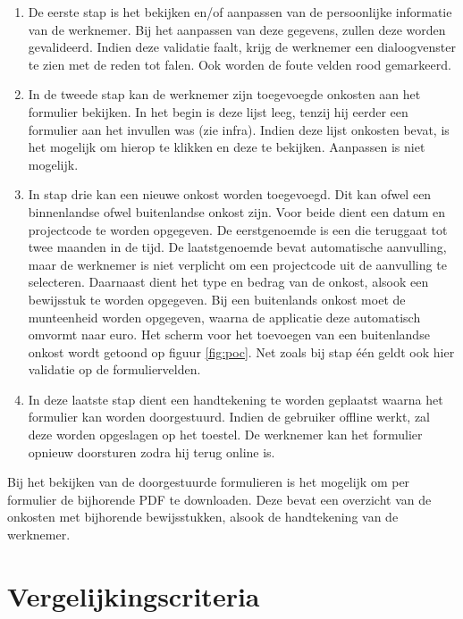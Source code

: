 \begin{enumerate}
\item De eerste stap is het bekijken en/of aanpassen van de persoonlijke informatie van de werknemer.
Bij het aanpassen van deze gegevens, zullen deze worden gevalideerd.
Indien deze validatie faalt, krijg de werknemer een dialoogvenster te zien met de reden tot falen.
Ook worden de foute velden rood gemarkeerd.

\item In de tweede stap kan de werknemer zijn toegevoegde onkosten aan het formulier bekijken.
In het begin is deze lijst leeg, tenzij hij eerder een formulier aan het invullen was (zie infra).
Indien deze lijst onkosten bevat, is het mogelijk om hierop te klikken en deze te bekijken. Aanpassen is niet mogelijk.

\item In stap drie kan een nieuwe onkost worden toegevoegd.
Dit kan ofwel een binnenlandse ofwel buitenlandse onkost zijn.
Voor beide dient een datum en projectcode te worden opgegeven.
De eerstgenoemde is een  die teruggaat tot twee maanden in de tijd.
De laatstgenoemde bevat automatische aanvulling, maar de werknemer is niet verplicht om een projectcode uit de aanvulling te selecteren.
Daarnaast dient het type en bedrag van de onkost, alsook een bewijsstuk te worden opgegeven.
Bij een buitenlands onkost moet de munteenheid worden opgegeven, waarna de applicatie deze automatisch omvormt naar euro.
Het scherm voor het toevoegen van een buitenlandse onkost wordt getoond op figuur \ref{fig:poc}. 
Net zoals bij stap één geldt ook hier validatie op de formuliervelden.

\item In deze laatste stap dient een handtekening te worden geplaatst waarna het formulier kan worden doorgestuurd.
Indien de gebruiker offline werkt, zal deze worden opgeslagen op het toestel.
De werknemer kan het formulier opnieuw doorsturen zodra hij terug online is.

\end{enumerate}

Bij het bekijken van de doorgestuurde formulieren is het mogelijk om per formulier de bijhorende PDF te downloaden. 
Deze bevat een overzicht van de onkosten met bijhorende bewijsstukken, alsook de handtekening van de werknemer.

\section{Vergelijkingscriteria}
\label{sec:vergelijking-criteria}

